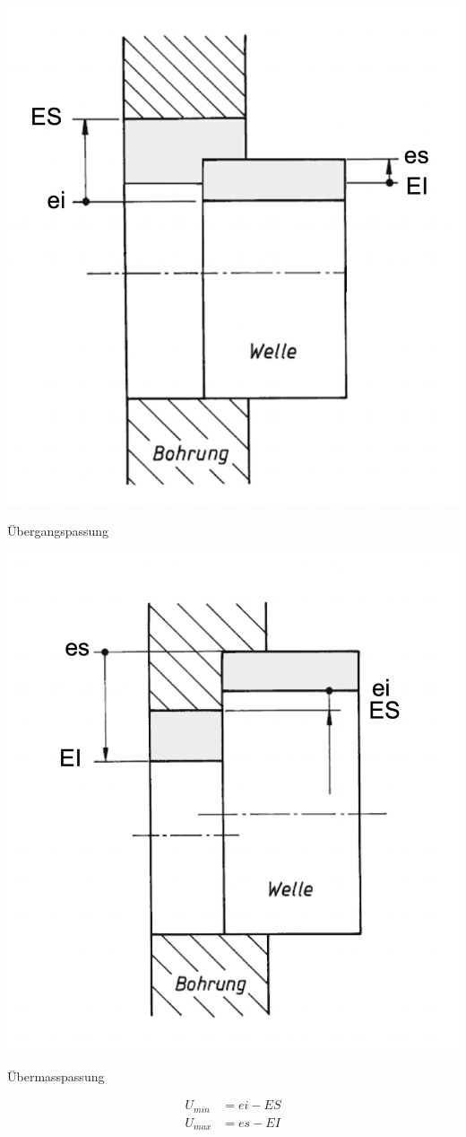     \begin{minipage}{0.99\linewidth}
        \begin{minipage}{0.49\linewidth}
            \begin{center}
                \includegraphics[width = 0.6\linewidth]{src/images/MAEIP_Uebergangspassung.png}
            \end{center}
        \end{minipage}
        \begin{minipage}{0.49\linewidth}
            Übergangspassung
        \end{minipage}
    \end{minipage}
    \begin{minipage}{0.99\linewidth}
        \begin{minipage}{0.49\linewidth}
            \begin{center}
                \includegraphics[width = 0.6\linewidth]{src/images/MAEIP_Uebermasspassung.png}
            \end{center}
        \end{minipage}
        \begin{minipage}{0.49\linewidth}
            Übermasspassung

            \begin{align*}
                U_{min} &= ei - ES\\
                U_{max} &= es - EI
            \end{align*}
        \end{minipage}
    \end{minipage}